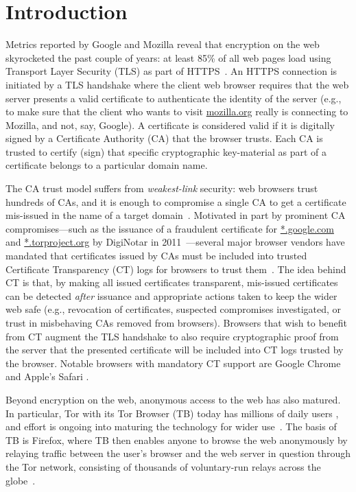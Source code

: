 \section{Introduction} \label{sec:introduction}
Metrics reported by Google and Mozilla reveal that encryption on the web
skyrocketed the past couple of years: at least 85\% of all web pages load using
Transport Layer Security (TLS) as part of
HTTPS~\cite{google-metrics,mozilla-metrics}. An HTTPS connection is initiated by
a TLS handshake where the client web browser requires that the web server
presents a valid certificate to authenticate the identity of the server (e.g.,
to make sure that the client who wants to visit \url{mozilla.org} really is
connecting to Mozilla, and not, say, Google). A certificate is considered valid
if it is digitally signed by a Certificate Authority (CA) that the browser
trusts. Each CA is trusted to certify (sign) that specific cryptographic
key-material as part of a certificate belongs to a particular domain name.

The CA trust model suffers from \emph{weakest-link} security: web browsers trust
hundreds of CAs, and it is enough to compromise a single CA to get a certificate
mis-issued in the name of a target domain~\cite{ca-ecosystem,https-sok}.
Motivated in part by prominent CA compromises---such as the issuance of a
fraudulent certificate for \url{*.google.com} and \url{*.torproject.org} by
DigiNotar in 2011~\cite{diginotar}---several major browser vendors have mandated
that certificates issued by CAs must be included into trusted Certificate
Transparency (CT) logs for browsers to trust them~\cite{ct/a,ct,ct/bis}. The
idea behind CT is that, by making all issued certificates transparent,
mis-issued certificates can be detected \emph{after} issuance and appropriate
actions taken to keep the wider web safe (e.g., revocation of certificates,
suspected compromises investigated, or trust in misbehaving CAs removed from
browsers). Browsers that wish to benefit from CT augment the TLS handshake to
also require cryptographic proof from the server that the presented certificate
will be included into CT logs trusted by the browser. Notable browsers with
mandatory CT support are Google Chrome and Apple's Safari
\cite{chrome-policy,safari-policy}.

Beyond encryption on the web, anonymous access to the web has also matured. In
particular, Tor with its Tor Browser (TB) today has millions of daily users
\cite{tor,mani}, and effort is ongoing into maturing the technology for wider
use~\cite{fftor}. The basis of TB is Firefox, where TB then enables anyone to
browse the web anonymously by relaying traffic between the user's browser and
the web server in question through the Tor network, consisting of thousands of
voluntary-run relays across the globe~\cite{relay-by-flag}. 

